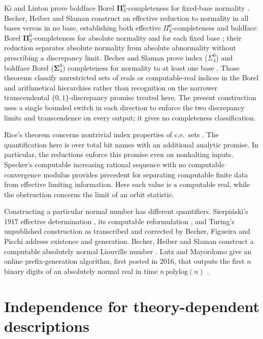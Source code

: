 \documentclass[11pt]{article}
\begin{document}
Ki and Linton prove boldface Borel \(\boldsymbol{\Pi}^0_3\)-completeness for fixed-base normality \cite{kilinton}. Becher, Heiber and Slaman construct an effective reduction to normality in all bases versus in no base, establishing both effective \(\Pi^0_3\)-completeness and boldface Borel \(\boldsymbol{\Pi}^0_3\)-completeness for absolute normality and for each fixed base \cite[Theorem~3.2 and Corollaries~3.3--3.4, p.~67; proofs p.~76]{bhs}; their reduction separates absolute normality from absolute abnormality without prescribing a discrepancy limit. Becher and Slaman prove index (\(\Sigma^0_4\)) and boldface Borel (\(\boldsymbol{\Sigma}^0_4\)) completeness for normality to at least one base \cite[Theorem~1]{becherslaman}. Those theorems classify unrestricted sets of reals or computable-real indices in the Borel and arithmetical hierarchies rather than recognition on the narrower transcendental \(\{0,1\}\)-discrepancy promise treated here. The present construction uses a single bounded switch in each direction to enforce the two discrepancy limits and transcendence on every output; it gives no completeness classification.

Rice's theorem concerns nontrivial index properties of c.e.\ sets \cite{rice}. The quantification here is over total bit names with an additional analytic promise. In particular, the reductions enforce this promise even on nonhalting inputs. Specker's computable increasing rational sequence with no computable convergence modulus \cite{specker} provides precedent for separating computable finite data from effective limiting information. Here each value is a computable real, while the obstruction concerns the limit of an orbit statistic.

Constructing a particular normal number has different quantifiers. Sierpi\'nski's 1917 effective determination \cite{sierpinski}, its computable reformulation \cite{becherfigueira}, and Turing's unpublished construction as transcribed and corrected by Becher, Figueira and Picchi \cite{turing} address existence and generation. Becher, Heiber and Slaman construct a computable absolutely normal Liouville number \cite[p.~2939]{bhsliouville}. Lutz and Mayordomo give an online prefix-generation algorithm, first posted in 2016, that outputs the first \(n\) binary digits of an absolutely normal real in time \(n\,\mathrm{polylog}(n)\) \cite[Theorem~5.5, arXiv p.~17]{lutz}.

\section{Independence for theory-dependent descriptions}\label{sec:rosser}
\end{document}
